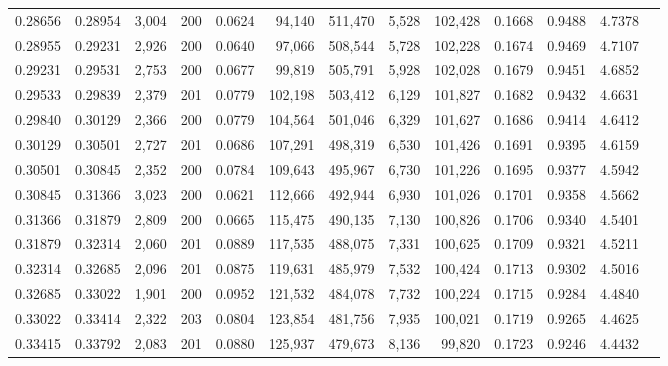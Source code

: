 \begin{tabular}{rrrrrrrrrrrrr}
0.28656 & 0.28954 & 3,004 & 200 &                                     0.0624 &  94,140 & 511,470 &   5,528 & 102,428 & 0.1668 & 0.9488 & 4.7378 \\
0.28955 & 0.29231 & 2,926 & 200 &                                     0.0640 &  97,066 & 508,544 &   5,728 & 102,228 & 0.1674 & 0.9469 & 4.7107 \\
0.29231 & 0.29531 & 2,753 & 200 &                                     0.0677 &  99,819 & 505,791 &   5,928 & 102,028 & 0.1679 & 0.9451 & 4.6852 \\
0.29533 & 0.29839 & 2,379 & 201 &                                     0.0779 & 102,198 & 503,412 &   6,129 & 101,827 & 0.1682 & 0.9432 & 4.6631 \\
0.29840 & 0.30129 & 2,366 & 200 &                                     0.0779 & 104,564 & 501,046 &   6,329 & 101,627 & 0.1686 & 0.9414 & 4.6412 \\
0.30129 & 0.30501 & 2,727 & 201 &                                     0.0686 & 107,291 & 498,319 &   6,530 & 101,426 & 0.1691 & 0.9395 & 4.6159 \\
0.30501 & 0.30845 & 2,352 & 200 &                                     0.0784 & 109,643 & 495,967 &   6,730 & 101,226 & 0.1695 & 0.9377 & 4.5942 \\
0.30845 & 0.31366 & 3,023 & 200 &                                     0.0621 & 112,666 & 492,944 &   6,930 & 101,026 & 0.1701 & 0.9358 & 4.5662 \\
0.31366 & 0.31879 & 2,809 & 200 &                                     0.0665 & 115,475 & 490,135 &   7,130 & 100,826 & 0.1706 & 0.9340 & 4.5401 \\
0.31879 & 0.32314 & 2,060 & 201 &                                     0.0889 & 117,535 & 488,075 &   7,331 & 100,625 & 0.1709 & 0.9321 & 4.5211 \\
0.32314 & 0.32685 & 2,096 & 201 &                                     0.0875 & 119,631 & 485,979 &   7,532 & 100,424 & 0.1713 & 0.9302 & 4.5016 \\
0.32685 & 0.33022 & 1,901 & 200 &                                     0.0952 & 121,532 & 484,078 &   7,732 & 100,224 & 0.1715 & 0.9284 & 4.4840 \\
0.33022 & 0.33414 & 2,322 & 203 &                                     0.0804 & 123,854 & 481,756 &   7,935 & 100,021 & 0.1719 & 0.9265 & 4.4625 \\
0.33415 & 0.33792 & 2,083 & 201 &                                     0.0880 & 125,937 & 479,673 &   8,136 &  99,820 & 0.1723 & 0.9246 & 4.4432 \\

\end{tabular}
